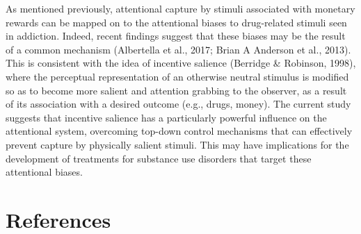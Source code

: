 \documentclass[jou, a4paper, noextraspace,floatsintext]{apa6}
\theoremstyle{definition}
\theoremstyle{definition}
\theoremstyle{definition}
\theoremstyle{remark}
\begin{document}
As mentioned previously, attentional capture by stimuli associated with
monetary rewards can be mapped on to the attentional biases to
drug-related stimuli seen in addiction. Indeed, recent findings suggest
that these biases may be the result of a common mechanism (Albertella et
al., 2017; Brian A Anderson et al., 2013). This is consistent with the
idea of incentive salience (Berridge \& Robinson, 1998), where the
perceptual representation of an otherwise neutral stimulus is modified
so as to become more salient and attention grabbing to the observer, as
a result of its association with a desired outcome (e.g., drugs, money).
The current study suggests that incentive salience has a particularly
powerful influence on the attentional system, overcoming top-down
control mechanisms that can effectively prevent capture by physically
salient stimuli. This may have implications for the development of
treatments for substance use disorders that target these attentional
biases.



























































\newpage

\section{References}\label{references}

\begingroup
\setlength{\parindent}{-0.5in} \setlength{\leftskip}{0.5in}
\end{document}

